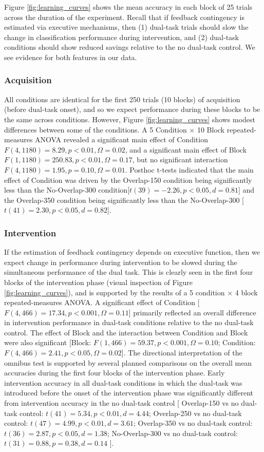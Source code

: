 \documentclass[apacite,draftfirst,man]{apa6}
\begin{document}
Figure \ref{fig:learning_curves} shows the mean accuracy in each block of 25
trials across the duration of the experiment. Recall that if feedback
contingency is estimated via executive mechanisms, then (1) dual-task trials
should slow the change in classification performance during intervention, and
(2) dual-task conditions should show reduced savings relative to the no
dual-task control. We see evidence for both features in our data.

\subsubsection*{Acquisition}
All conditions are identical for the first 250 trials (10 blocks) of acquisition
(before dual-task onset), and so we expect performance during these blocks to be
the same across conditions. However, Figure \ref{fig:learning_curves} shows
modest differences between some of the conditions. A 5 Condition $\times$ 10
Block repeated-measures ANOVA revealed a significant main effect of Condition
$F(4,1180) = 8.29, p < 0.01, \Omega = 0.02$, and a significant main effect of
Block $F(1,1180) = 250.83, p < 0.01, \Omega = 0.17$, but no significant
interaction $F(4,1180) = 1.95, p = 0.10, \Omega = 0.01$. Posthoc t-tests
indicated that the main effect of Condition was driven by the Overlap-150
condition being significantly less than the No-Overlap-300 condition[$t(39) =
-2.26, p < 0.05, d = 0.81$] and the Overlap-350 condition being significantly
less than the No-Overlap-300 [$t(41) = 2.30, p < 0.05, d = 0.82$].

\subsubsection*{Intervention}
If the estimation of feedback contingency depends on executive function,
then we expect change in performance during intervention to be slowed during the
simultaneous performance of the dual task. This is clearly seen in the first
four blocks of the intervention phase (visual inspection of Figure
\ref{fig:learning_curves}), and is supported by the results of a 5 condition
$\times$ 4 block repeated-measures ANOVA. A significant effect of Condition
[$F(4,466) = 17.34, p < 0.001, \Omega = 0.11$] primarily reflected an overall
difference in intervention performance in dual-task conditions relative to the
no dual-task control. The effect of Block and the interaction between Condition
and Block were also significant [Block: $F(1,466) = 59.37, p < 0.001, \Omega =
0.10$; Condition: $F(4,466) = 2.41, p < 0.05, \Omega = 0.02$]. The directional
interpretation of the omnibus test is supported by several planned comparisons
on the overall mean accuracies during the first four blocks of the intervention
phase. Early intervention accuracy in all dual-task conditions in which
the dual-task was introduced before the onset of the intervention phase was
significantly different from intervention accuracy in the no dual-task control
[
Overlap-150 vs no dual-task control: $t(41) = 5.34, p < 0.01, d = 4.44$;
Overlap-250 vs no dual-task control: $t(47) = 4.99, p < 0.01, d = 3.61$;
Overlap-350 vs no dual-task control: $t(36) = 2.87, p < 0.05, d = 1.38$;
No-Overlap-300 vs no dual-task control: $t(31) = 0.88, p = 0.38, d = 0.14$ 
].
\end{document}
